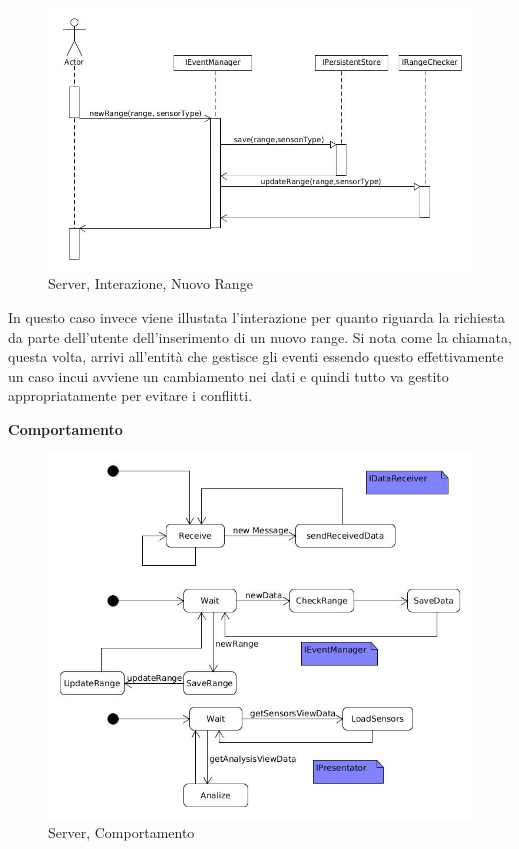 \begin{figure}[h]
\centering
\includegraphics[scale=0.4]{Figures/DomainModel/Server/NewRangeInteraction}
\caption{Server, Interazione, Nuovo Range}
\end{figure}

In questo caso invece viene illustata l'interazione per quanto riguarda la richiesta da parte dell'utente dell'inserimento di un nuovo range. Si nota come la chiamata, questa volta, arrivi all'entit\`a che gestisce gli eventi essendo questo effettivamente un caso incui avviene un cambiamento nei dati e quindi tutto va gestito appropriatamente per evitare i conflitti.

\begin{center}
\textbf{Comportamento}
\end{center}

\begin{figure}[h]
\centering
\includegraphics[width=\textwidth]{Figures/DomainModel/Server/Behaviour}
\caption{Server, Comportamento}
\end{figure}


